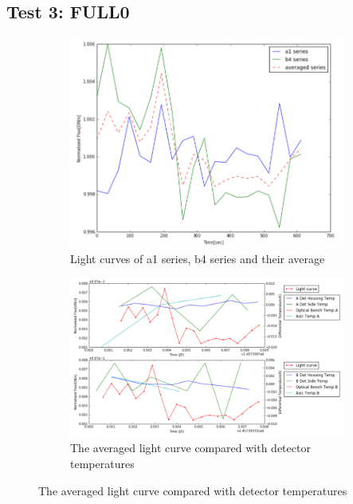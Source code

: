 \documentclass{aastex6}
\begin{document}
\subsection{Test 3: FULL0} 
\begin{figure}[H]
    \centering
    \begin{subfigure}{1}
        \includegraphics[scale=0.4]{ts_test3}
        \caption{Light curves of a1 series, b4 series and their average}
    \end{subfigure}

    \begin{subfigure}{2}
        \includegraphics[scale=0.4]{temp_test3}
        \caption{The averaged light curve compared with detector temperatures}
    \end{subfigure}
   

\end{figure}
\end{document}
